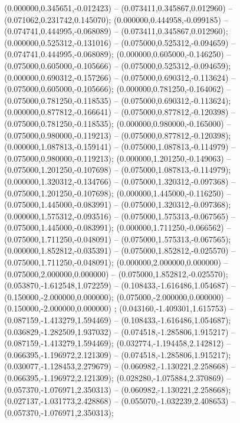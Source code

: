  (0.000000,0.345651,-0.012423) -- (0.073411,0.345867,0.012960) -- (0.071062,0.231742,0.145070);
 (0.000000,0.444958,-0.099185) -- (0.074741,0.444995,-0.068089) -- (0.073411,0.345867,0.012960);
 (0.000000,0.525312,-0.131016) -- (0.075000,0.525312,-0.094659) -- (0.074741,0.444995,-0.068089);
 (0.000000,0.605000,-0.146250) -- (0.075000,0.605000,-0.105666) -- (0.075000,0.525312,-0.094659);
 (0.000000,0.690312,-0.157266) -- (0.075000,0.690312,-0.113624) -- (0.075000,0.605000,-0.105666);
 (0.000000,0.781250,-0.164062) -- (0.075000,0.781250,-0.118535) -- (0.075000,0.690312,-0.113624);
 (0.000000,0.877812,-0.166641) -- (0.075000,0.877812,-0.120398) -- (0.075000,0.781250,-0.118535);
 (0.000000,0.980000,-0.165000) -- (0.075000,0.980000,-0.119213) -- (0.075000,0.877812,-0.120398);
 (0.000000,1.087813,-0.159141) -- (0.075000,1.087813,-0.114979) -- (0.075000,0.980000,-0.119213);
 (0.000000,1.201250,-0.149063) -- (0.075000,1.201250,-0.107698) -- (0.075000,1.087813,-0.114979);
 (0.000000,1.320312,-0.134766) -- (0.075000,1.320312,-0.097368) -- (0.075000,1.201250,-0.107698);
 (0.000000,1.445000,-0.116250) -- (0.075000,1.445000,-0.083991) -- (0.075000,1.320312,-0.097368);
 (0.000000,1.575312,-0.093516) -- (0.075000,1.575313,-0.067565) -- (0.075000,1.445000,-0.083991);
 (0.000000,1.711250,-0.066562) -- (0.075000,1.711250,-0.048091) -- (0.075000,1.575313,-0.067565);
 (0.000000,1.852812,-0.035391) -- (0.075000,1.852812,-0.025570) -- (0.075000,1.711250,-0.048091);
 (0.000000,2.000000,0.000000) -- (0.075000,2.000000,0.000000) -- (0.075000,1.852812,-0.025570);
 (0.053870,-1.612548,1.072259) -- (0.108433,-1.616486,1.054687) -- (0.150000,-2.000000,0.000000);
 (0.075000,-2.000000,0.000000) -- (0.150000,-2.000000,0.000000) ;
 (0.043160,-1.409301,1.615753) -- (0.087159,-1.413279,1.594469) -- (0.108433,-1.616486,1.054687);
 (0.036829,-1.282509,1.937032) -- (0.074518,-1.285806,1.915217) -- (0.087159,-1.413279,1.594469);
 (0.032774,-1.194458,2.142812) -- (0.066395,-1.196972,2.121309) -- (0.074518,-1.285806,1.915217);
 (0.030077,-1.128453,2.279679) -- (0.060982,-1.130221,2.258668) -- (0.066395,-1.196972,2.121309);
 (0.028280,-1.075884,2.370869) -- (0.057370,-1.076971,2.350313) -- (0.060982,-1.130221,2.258668);
 (0.027137,-1.031773,2.428868) -- (0.055070,-1.032239,2.408653) -- (0.057370,-1.076971,2.350313);
